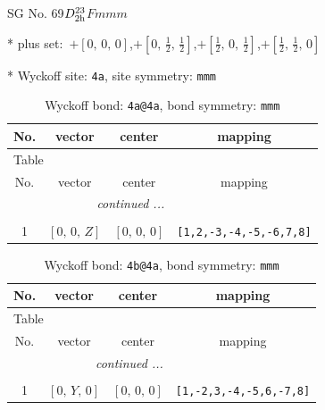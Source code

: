 \documentclass[fleqn,8pt]{jsarticle}
\begin{document}
\setcounter{MaxMatrixCols}{32}

\renewcommand{\tablename}{Table~}
\renewcommand{\figurename}{Figure~}
\begin{center}
\LARGE
SG No. 69\quad$D_{\rm 2h}^{23}$\quad$Fmmm$\quad[ orthorhombic ]
\end{center}

* plus set:\,\,\,$+\left[ 0,\, 0,\, 0 \right]$,\quad $+\left[ 0,\, \frac{1}{2},\, \frac{1}{2} \right]$,\quad $+\left[ \frac{1}{2},\, 0,\, \frac{1}{2} \right]$,\quad $+\left[ \frac{1}{2},\, \frac{1}{2},\, 0 \right]$


* Wyckoff site: {\tt 4a}, site symmetry: {\tt mmm}
\renewcommand{\arraystretch}{1.2}
\begin{longtable}{cccc}
\caption{Wyckoff bond: {\tt 4a@4a}, bond symmetry: {\tt mmm}}
 \\
 \hline \hline
No. & vector & center & mapping \\ \hline \endfirsthead

\multicolumn{3}{l}{\tablename\ \thetable{}} \\
 \hline \hline
No. & vector & center & mapping \\ \hline \endhead

 \hline \hline
\multicolumn{3}{r}{\footnotesize\it continued ...} \\ \endfoot

 \hline \hline
\multicolumn{3}{r}{} \\ \endlastfoot

1 & $\left[ 0,\, 0,\, Z \right]$ & $\left[ 0,\, 0,\, 0 \right]$ & {\tt [1,2,-3,-4,-5,-6,7,8]} \\
\end{longtable}
\renewcommand{\arraystretch}{1.2}
\begin{longtable}{cccc}
\caption{Wyckoff bond: {\tt 4b@4a}, bond symmetry: {\tt mmm}}
 \\
 \hline \hline
No. & vector & center & mapping \\ \hline \endfirsthead

\multicolumn{3}{l}{\tablename\ \thetable{}} \\
 \hline \hline
No. & vector & center & mapping \\ \hline \endhead

 \hline \hline
\multicolumn{3}{r}{\footnotesize\it continued ...} \\ \endfoot

 \hline \hline
\multicolumn{3}{r}{} \\ \endlastfoot

1 & $\left[ 0,\, Y,\, 0 \right]$ & $\left[ 0,\, 0,\, 0 \right]$ & {\tt [1,-2,3,-4,-5,6,-7,8]} \\
\end{longtable}
\end{document}
